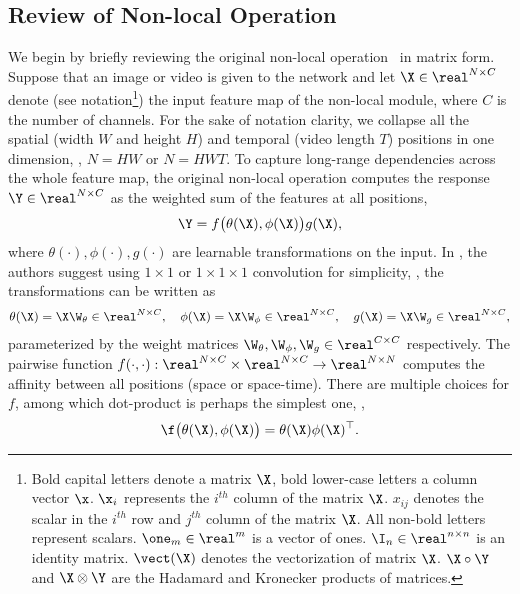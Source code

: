 \documentclass{article}
\begin{document}
\subsection{Review of Non-local Operation}
\label{subsect:general non-local formulation}
We begin by briefly reviewing the original non-local operation~\cite{non-local} in matrix form.
Suppose that an image or video is given to the network and let $\X \in \real^{N \times C}$ denote (see notation\footnote{Bold capital
  letters denote a matrix $\X$, bold lower-case letters a column
  vector $\x$. $\x_i$ represents the $i^{th}$ column of the matrix
  $\X$. $x_{ij}$ denotes the scalar in the $i^{th}$ row
  and $j^{th}$ column of the matrix $\X$. All non-bold letters
  represent scalars.
  $\one_{m} \in \real^{m}$ is a vector of ones.
  $\I_n \in \real^{n \times n}$ is an identity matrix.
  $\vect(\X)$ denotes the vectorization of matrix
  $\X$. $\X \circ \Y$ and $\X \otimes \Y$ are the Hadamard and
  Kronecker products of matrices.}) the input feature map of the non-local module, where $C$ is the number of channels.
For the sake of notation clarity, we collapse all the spatial (width $W$ and height $H$) and temporal (video length $T$) positions in one dimension, \ie, $N=HW$ or $N=HWT$.
To capture long-range dependencies across the whole feature map,
the original non-local operation computes the response $\Y \in \real^{N \times C}$ as the weighted sum of the features at all positions,
\begin{align}
\label{eq:nl}
  \Y = f\big(\theta(\X), \phi(\X) \big) g(\X),
\end{align}
where $\theta(\cdot), \phi(\cdot), g(\cdot)$ are learnable transformations on the input.
In \cite{non-local}, the authors suggest using $1\times1$ or $1 \times 1 \times 1$ convolution for simplicity, \ie, the transformations can be written as
\begin{align}
  \label{eq:linear}
  \theta(\X) = \X \W_\theta \in \real^{N \times C}, \quad \phi(\X) = \X \W_\phi \in \real^{N \times C}, \quad g(\X) = \X \W_g \in \real^{N \times C},
\end{align}
parameterized by the weight matrices $\W_\theta, \W_\phi, \W_g \in \real^{C \times C}$ respectively.
The pairwise function $f(\cdot, \cdot) : \real^{N \times C} \times \real^{N \times C} \rightarrow \real^{N \times N}$ computes the affinity between all positions (space or space-time).
There are multiple choices for $f$, among which dot-product is perhaps the simplest one, \ie,
\begin{align}
  \label{eq:f}
  \f\big( \theta(\X), \phi(\X) \big) = \theta(\X) \phi(\X)^\top.
\end{align}
\end{document}
